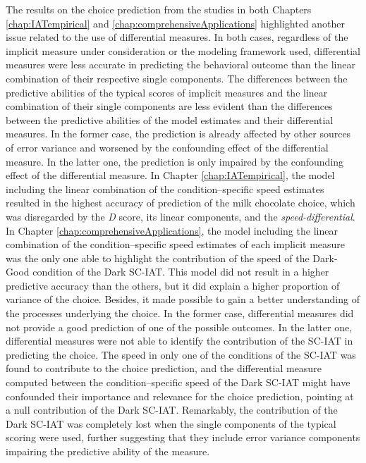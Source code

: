 \documentclass[12pt]{book}
\begin{document}
The results on the choice prediction from the studies in both Chapters  \ref{chap:IATempirical} and \ref{chap:comprehensiveApplications} highlighted another issue related to the use of differential measures.
In both cases, regardless of the implicit measure under consideration or the modeling framework used, differential measures were less accurate in predicting the behavioral outcome than the linear combination of their respective single components. 
The differences between the predictive abilities of the typical scores of implicit measures and the linear combination of their single components are less evident than the differences between the predictive abilities of the model estimates and their differential measures. In the former case, the prediction is already affected by other sources of error variance and worsened by the confounding effect of the differential measure. In the latter one, the prediction is only impaired by the confounding effect of the differential measure.
In Chapter \ref{chap:IATempirical}, the model including the linear combination of the condition--specific speed estimates resulted in the highest accuracy of prediction of the milk chocolate choice, which was disregarded by the \emph{D} score, its linear components, and the \emph{speed-differential}. 
In Chapter \ref{chap:comprehensiveApplications}, the model including the linear combination of the condition--specific speed estimates of each implicit measure was the only one able to highlight the contribution of the speed of the Dark-Good condition of the Dark SC-IAT.
This model did not result in a higher predictive accuracy than the others, but it did explain a higher proportion of variance of the choice. 
Besides, it made possible to gain a better understanding of the processes underlying the choice. 
In the former case, differential measures did not provide a good prediction of one of the possible outcomes. 
In the latter one, differential measures were not able to identify the contribution of the SC-IAT in predicting the choice. 
The speed in only one of the conditions of the SC-IAT was found to contribute to the choice prediction, and the differential measure computed between the condition--specific speed of the Dark SC-IAT might have confounded their importance and relevance for the choice prediction, pointing at a null contribution of the Dark SC-IAT. 
Remarkably, the contribution of the Dark SC-IAT was completely lost when the single components of the typical scoring were used, further suggesting that they include error variance components impairing the predictive ability of the measure.
\end{document}
